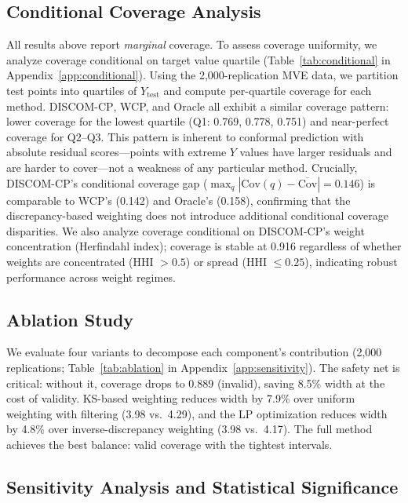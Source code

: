 \documentclass{article}
\newcommand{\DISCOM}{\textsc{DISCOM-CP}}
\begin{document}
\subsection{Conditional Coverage Analysis}
\label{sec:conditional}

All results above report \emph{marginal} coverage. To assess coverage uniformity, we analyze coverage conditional on target value quartile (Table~\ref{tab:conditional} in Appendix~\ref{app:conditional}). Using the 2{,}000-replication MVE data, we partition test points into quartiles of $Y_{\text{test}}$ and compute per-quartile coverage for each method. \DISCOM{}, WCP, and Oracle all exhibit a similar coverage pattern: lower coverage for the lowest quartile (Q1: 0.769, 0.778, 0.751) and near-perfect coverage for Q2--Q3. This pattern is inherent to conformal prediction with absolute residual scores---points with extreme $Y$ values have larger residuals and are harder to cover---not a weakness of any particular method. Crucially, \DISCOM{}'s conditional coverage gap ($\max_q |\text{Cov}(q) - \overline{\text{Cov}}| = 0.146$) is comparable to WCP's (0.142) and Oracle's (0.158), confirming that the discrepancy-based weighting does not introduce additional conditional coverage disparities. We also analyze coverage conditional on \DISCOM{}'s weight concentration (Herfindahl index); coverage is stable at 0.916 regardless of whether weights are concentrated (HHI $> 0.5$) or spread (HHI $\leq 0.25$), indicating robust performance across weight regimes.

\subsection{Ablation Study}
\label{sec:ablation}

We evaluate four variants to decompose each component's contribution (2,000 replications; Table~\ref{tab:ablation} in Appendix~\ref{app:sensitivity}). The safety net is critical: without it, coverage drops to 0.889 (invalid), saving 8.5\% width at the cost of validity. KS-based weighting reduces width by 7.9\% over uniform weighting with filtering (3.98 vs.\ 4.29), and the LP optimization reduces width by 4.8\% over inverse-discrepancy weighting (3.98 vs.\ 4.17). The full method achieves the best balance: valid coverage with the tightest intervals.

\subsection{Sensitivity Analysis and Statistical Significance}
\label{sec:sensitivity}
\end{document}
